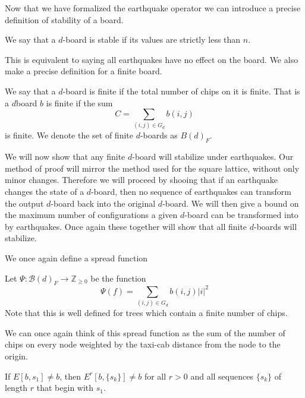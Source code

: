 \documentclass[runningheads,a4paper]{llncs}
\begin{document}
Now that we have formalized the earthquake operator we can introduce a precise definition of stability of a board. 
\begin{definition}
We say that a $d$-board is stable if its values are strictly less than $n$.
\end{definition}
This is equivalent to saying all earthquakes have no effect on the board. We also make a precise definition for a finite board.
\begin{definition} 
We say that a $d$-board is finite if the total number of chips on it is finite. That is a $d$board $b$ is finite if the sum
\begin{equation}
C= \sum_{(i,j) \in G_d} b(i,j) 
\end{equation}
is finite. 
We denote the set of finite $d$-boards as $B(d)_F$.
\end{definition}

We will now show that any finite $d$-board will stabilize under earthquakes. Our method of proof will mirror the method used for the square lattice, without only minor changes.  Therefore we will proceed by shooing that if an earthquake changes the state of a $d$-board, then no sequence of earthquakes can transform the output $d$-board back into the original $d$-board. We will then give a bound on the maximum number of configurations a given $d$-board can be transformed into by earthquakes. Once again these together will show that all finite $d$-boards will stabilize.

We once again define a spread function 
\begin{definition}
 Let $\Psi: \mathcal{B}(d)_F \rightarrow \mathbb{Z}_{\geq 0}$ be the function
\begin{equation}
\Psi(f) = \sum_{(i,j) \in G_d} b(i,j) |i|^2
\end{equation}
Note that this is well defined for trees which contain a finite number of chips. 
\end{definition} 
We can once again think of this spread function as the sum of the number of chips on every node weighted by the taxi-cab distance from the node to the origin.

\begin{lemma}
If $E[b, s_1] \neq b$, then $E^r[b, \{s_k\}] \neq b$ for all $r>0$ and all sequences $\{s_k\}$ of length $r$ that begin with $s_1$. 
\end{lemma}
\end{document}
